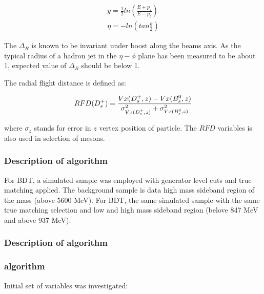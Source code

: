 \begin{align} 
y = \frac{1}{2}ln(\frac{E+p_z}{E-p_z}) \\
\eta =- ln (tan \frac{\theta}{2})
\label{eq::bdt_3}
\end{align}

The $\Delta_R$ is known to be invariant under boost along the beams axis.  As the typical radius of a hadron jet in the $\eta-\phi$ plane has been measured to be about 1, expected value of $\Delta_R$ should be below 1.

The radial flight distance is defined as:

\begin{equation}
RFD({{D}^+_{s}}) = \frac{Vx({{D}^+_{s}},z)-Vx({{B}^0_{s}},z)}{\sigma_{Vx({{D}^+_{s}},z)}^2+\sigma_{Vx({{B}^0_{s}},z)}^2}
\label{eq::bdt_4}
\end{equation}

where $\sigma_z$ stands for error in $z$ vertex position of particle. The $RFD$ variables is also used in selection of \KS mesons.
\subsubsection{Description of \Bs algorithm }

For \Bs BDT, a simulated sample was employed with generator level cuts and true matching applied. The background sample is data high mass sideband region of the \Bs mass (above 5600 MeV). For \Kstarm BDT, the same simulated sample with the same  true matching selection and \Kstarm low and high mass sideband region (belove 847 MeV and above 937 MeV).

\subsubsection{Description of \Kstar algorithm }


\subsubsection{\Bs algorithm}

Initial set of variables was investigated:

